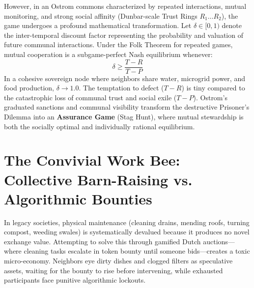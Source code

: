However, in an Ostrom commons characterized by repeated interactions, mutual monitoring, and strong social affinity (Dunbar-scale Trust Rings $R_1 \dots R_2$), the game undergoes a profound mathematical transformation. Let $\delta \in [0, 1)$ denote the inter-temporal discount factor representing the probability and valuation of future communal interactions. Under the Folk Theorem for repeated games, mutual cooperation is a subgame-perfect Nash equilibrium whenever:
\begin{equation}
\delta \ge \frac{T - R}{T - P}
\label{eq:folk_theorem_commons}
\end{equation}
In a cohesive sovereign node where neighbors share water, microgrid power, and food production, $\delta \to 1.0$. The temptation to defect ($T - R$) is tiny compared to the catastrophic loss of communal trust and social exile ($T - P$). Ostrom's graduated sanctions and communal visibility transform the destructive Prisoner's Dilemma into an \textbf{Assurance Game} (Stag Hunt), where mutual stewardship is both the socially optimal and individually rational equilibrium.

\section{The Convivial Work Bee: Collective Barn-Raising vs. Algorithmic Bounties}
\label{sec:convivial_work_bee}

In legacy societies, physical maintenance (cleaning drains, mending roofs, turning compost, weeding swales) is systematically devalued because it produces no novel exchange value. Attempting to solve this through gamified Dutch auctions---where cleaning tasks escalate in token bounty until someone bids---creates a toxic micro-economy. Neighbors eye dirty dishes and clogged filters as speculative assets, waiting for the bounty to rise before intervening, while exhausted participants face punitive algorithmic lockouts.

